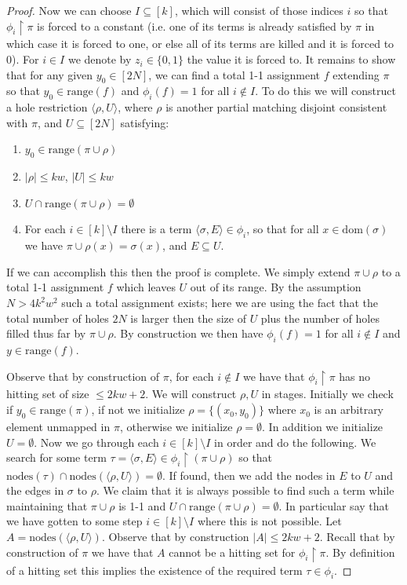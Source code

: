\documentclass[11pt]{article}
\newcommand{\B}{\{0,1\}}
\newcommand{\dom}{\mathrm{dom}}
\newcommand{\nodes}{\mathrm{nodes}}
\begin{document}
\begin{proof}
Now we can choose $I \subseteq [k]$, which will consist of those indices $i$ so that $\phi_i\upharpoonright\pi$ is forced to a constant (i.e. one of its terms is already satisfied by $\pi$ in which case it is forced to one, or else all of its terms are killed and it is forced to 0). For $i \in I$ we denote by $z_i \in \B$ the value it is forced to. It remains to show that for any given $y_0 \in [2N]$, we can find a total 1-1 assignment $f$ extending $\pi$ so that $y_0 \in \mathrm{range}(f)$ and $\phi_i(f)=1$ for all $i \notin I$. To do this we will construct a hole restriction $\langle \rho, U\rangle $, where $\rho$ is another partial matching disjoint consistent with $\pi$, and $U \subseteq [2N]$ satisfying:
\begin{enumerate}
    \item $y_0 \in \mathrm{range}(\pi \cup \rho)$
    \item $|\rho| \leq kw$, $|U| \leq kw$
    \item $U \cap \mathrm{range}(\pi \cup \rho) = \emptyset$
    \item For each $i \in [k] \setminus I$ there is a term $\langle \sigma, E\rangle \in \phi_i$, so that for all $x \in \dom(\sigma)$ we have $\pi \cup \rho(x) = \sigma(x)$, and $E \subseteq U$.
\end{enumerate}

If we can accomplish this then the proof is complete. We simply extend $\pi \cup \rho$ to a total 1-1 assignment $f$ which leaves $U$ out of its range. By the assumption $N > 4k^2w^2$ such a total assignment exists; here we are using the fact that the total number of holes $2N$ is larger then the size of $U$ plus the number of holes filled thus far by $\pi \cup \rho$. By construction we then have $\phi_i(f)=1$ for all $i \notin I$ and $y \in \mathrm{range}(f)$.

Observe that by construction of $\pi$, for each $i \notin I$ we have that $\phi_i\upharpoonright\pi$ has no hitting set of size $\leq 2kw+2$. We will construct $\rho, U$ in stages. Initially we check if $y_0 \in \mathrm{range}(\pi)$, if not we initialize $\rho = \{(x_0,y_0)\}$ where $x_0$ is an arbitrary element unmapped in $\pi$, otherwise we initialize $\rho = \emptyset$. 
In addition we initialize $U = \emptyset$. Now we go through each $i \in [k] \setminus I$ in order and do the following. We search for some term $\tau = \langle \sigma, E\rangle \in \phi_i \upharpoonright (\pi \cup \rho)$ so that $\nodes(\tau) \cap \nodes(\langle \rho, U\rangle) = \emptyset$. If found, then we add the nodes in $E$ to $U$ and the edges in $\sigma$ to $\rho$. We claim that it is always possible to find such a term while maintaining that $\pi \cup \rho$ is 1-1 and $U \cap \mathrm{range}(\pi \cup \rho) = \emptyset$. In particular say that we have gotten to some step $i \in [k] \setminus I$ where this is not possible. Let $A = \nodes(\langle \rho, U\rangle)$. Observe that by construction $|A|\leq 2kw+2$. Recall that by construction of $\pi$ we have that $A$ cannot be a hitting set for $\phi_i\upharpoonright\pi$. By definition of a hitting set this implies the existence of the required term $\tau \in \phi_i$.
\end{proof}
\end{document}
